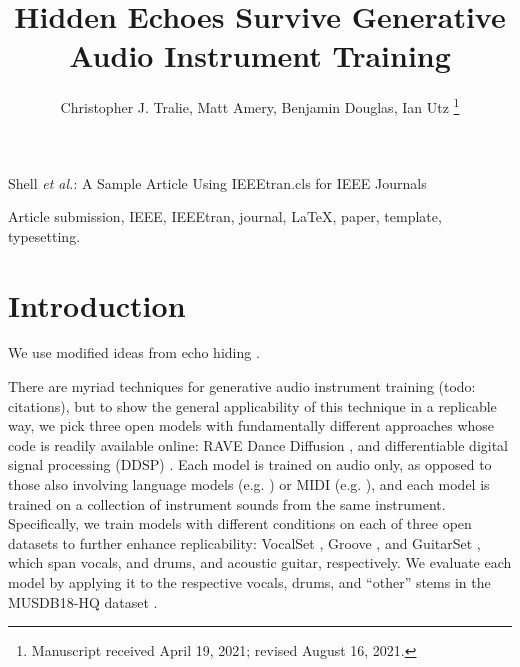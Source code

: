 \documentclass[lettersize,journal]{IEEEtran}
\begin{document}
\title{Hidden Echoes Survive Generative Audio Instrument Training}

\author{Christopher J. Tralie, Matt Amery, Benjamin Douglas, Ian Utz
\thanks{Manuscript received April 19, 2021; revised August 16, 2021.}}

%
{Shell \MakeLowercase{\textit{et al.}}: A Sample Article Using IEEEtran.cls for IEEE Journals}


\maketitle

\begin{abstract}



\end{abstract}

\begin{IEEEkeywords}
Article submission, IEEE, IEEEtran, journal, \LaTeX, paper, template, typesetting.
\end{IEEEkeywords}

\section{Introduction}

We use modified ideas from echo hiding \cite{gruhl1996echo}.

There are myriad techniques for generative audio instrument training (todo: citations), but to show the general applicability of this technique in a replicable way, we pick three open models with fundamentally different approaches whose code is readily available online: RAVE \cite{caillon2021rave} Dance Diffusion \cite{evans2022dancediffusion}, and differentiable digital signal processing (DDSP) \cite{engelddsp}.  Each model is trained on audio only, as opposed to those also involving language models (e.g. \cite{evans2024fast}) or MIDI (e.g. \cite{hawthornemulti}), and each model is trained on a collection of instrument sounds from the same instrument.  Specifically, we train models with different conditions on each of three open datasets to further enhance replicability: VocalSet \cite{wilkins2018vocalset}, Groove \cite{groove2019}, and GuitarSet \cite{xi2018guitarset}, which span vocals, and drums, and acoustic guitar, respectively.  We evaluate each model by applying it to the respective vocals, drums, and ``other'' stems in the MUSDB18-HQ dataset \cite{musdb18-hq}.
\end{document}
